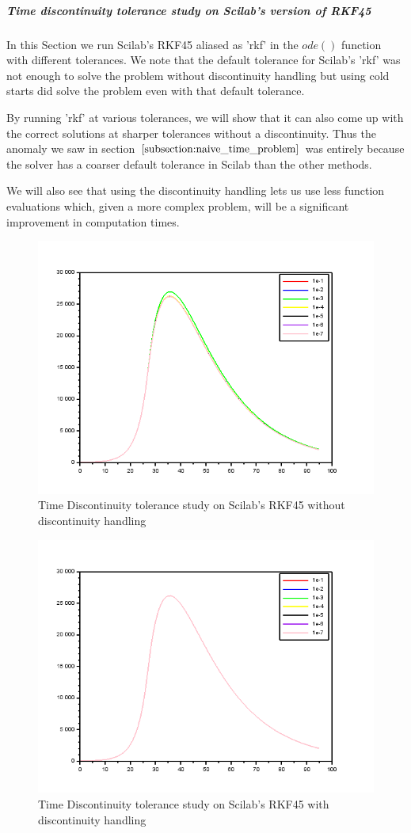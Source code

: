 \subparagraph{Time discontinuity tolerance study on Scilab's version of RKF45}
In this Section we run Scilab's RKF45 aliased as 'rkf' in the $ode()$ function with different tolerances. We note that the default tolerance for Scilab's 'rkf' was not enough to solve the problem without discontinuity handling but using cold starts did solve the problem even with that default tolerance. 

By running 'rkf' at various tolerances, we will show that it can also come up with the correct solutions at sharper tolerances without a discontinuity. Thus the anomaly we saw in section $\ref{subsection:naive_time_problem}$ was entirely because the solver has a coarser default tolerance in Scilab than the other methods.

We will also see that using the discontinuity handling lets us use less function evaluations which, given a more complex problem, will be a significant improvement in computation times.

\begin{figure}[h]
	\centering
	\includegraphics[width=0.7\linewidth]{./figures/tolerance_time_rk45_no_event_sci}
	\caption{Time Discontinuity tolerance study on Scilab's RKF45 without discontinuity handling}
	\label{fig:tolerance_time_rk45_no_event_sci}
\end{figure}

\begin{figure}[h]
	\centering
	\includegraphics[width=0.7\linewidth]{./figures/tolerance_time_rk45_with_event_sci}
	\caption{Time Discontinuity tolerance study on Scilab's RKF45 with discontinuity handling}
	\label{fig:tolerance_time_rk45_with_event_sci}
\end{figure}

